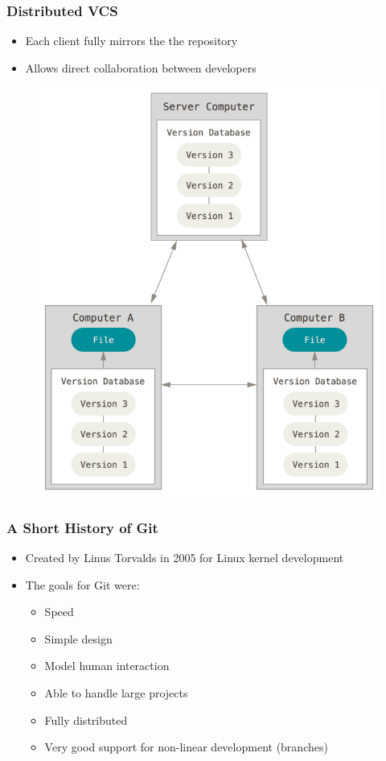 \documentclass{beamer}
\begin{document}
\begin{frame}
	\frametitle{Distributed VCS}
	\begin{itemize}
		\item{Each client fully mirrors the the repository}
		\item{Allows direct collaboration between developers}
	\end{itemize}
	\begin{figure}
		\includegraphics[scale=0.25]{Distributed_VCS-0.png}
	\end{figure}

\end{frame}


\begin{frame}
	\frametitle{A Short History of Git}
	\begin{itemize}
		\item{Created by Linus Torvalds in 2005 for Linux kernel development}
		\item{The goals for Git were:}
		\begin{itemize}
			\item{Speed}
			\item{Simple design}
			\item{Model human interaction}
			\item{Able to handle large projects}
			\item{Fully distributed}
			\item{Very good support for non-linear development (branches)}
		\end{itemize}
	\end{itemize}
\end{frame}
\end{document}
